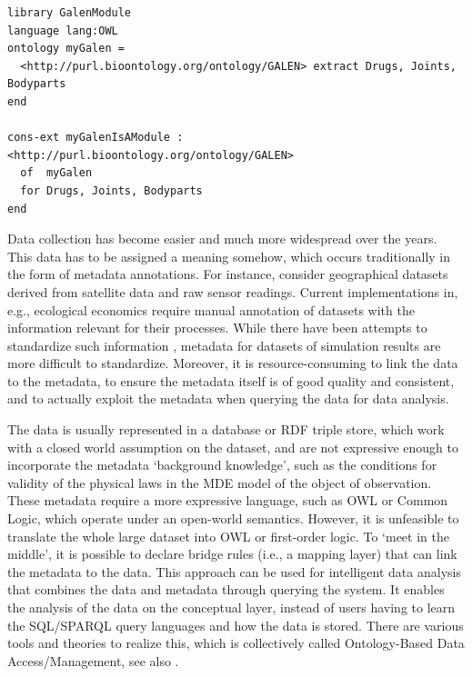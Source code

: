 \documentclass[10pt, a4paper]{isov2}
\newcommand*{\termref}[1]{\index{#1}#1\xspace}
\begin{document}
\begin{lstlisting}[basicstyle=\ttfamily,language=dolText,escapechar=@,mathescape]
%prefix( lang:  <http://purl.net/DOL/languages/> )%
library GalenModule
language lang:OWL
ontology myGalen = 
  <http://purl.bioontology.org/ontology/GALEN> extract Drugs, Joints, Bodyparts
end

cons-ext myGalenIsAModule : <http://purl.bioontology.org/ontology/GALEN>
  of  myGalen 
  for Drugs, Joints, Bodyparts
end
\end{lstlisting}
 

Data collection has become easier and much more widespread over the years. This data has to be 
assigned a meaning somehow, which occurs traditionally in the  form of metadata annotations. For 
instance, consider geographical datasets derived from satellite data and raw sensor readings. 
Current implementations in, e.g., ecological economics \cite{bagstad_aries_2011} require manual 
annotation of datasets with the information relevant for their processes. While there have been 
attempts to standardize such information \cite{european_comission_inspire_2014}, metadata for 
datasets of simulation results are more difficult to standardize. Moreover, it is 
resource-consuming to link the data to the metadata, to ensure the metadata itself is of good 
quality and consistent, and to actually exploit the metadata when querying the data for data 
analysis. 

The data is usually represented in a database or RDF triple store, which work with a \termref{closed world assumption} on the dataset, and are not expressive enough to 
incorporate the metadata `background knowledge', such as the conditions for validity of the physical laws in the MDE model of the object of observation. These metadata 
require a more expressive language, such as OWL or Common Logic, which operate under an open-world semantics. However, it is unfeasible to translate the 
whole large dataset into OWL or first-order logic. To `meet in the middle', it is possible to declare bridge rules (i.e., a mapping layer) that can link the metadata to 
the data. This approach can be used for intelligent data analysis that combines the data and metadata through querying the system. It enables the analysis of the 
data on the conceptual layer, instead of users having to learn the SQL/SPARQL query languages and how the data is stored. There are various tools and theories 
to realize this, which is collectively called Ontology-Based Data Access/Management, see also \cite{CalvaneseEtAl11}.
\end{document}
